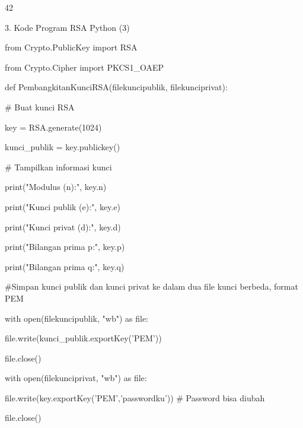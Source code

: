 \documentclass{article}
\begin{document}

42

3. Kode Program RSA Python (3)

from Crypto.PublicKey import RSA

from Crypto.Cipher import PKCS1\_OAEP

def PembangkitanKunciRSA(filekuncipublik, filekunciprivat):

    \# Buat kunci RSA

    key = RSA.generate(1024)

    kunci\_publik = key.publickey()


    \# Tampilkan informasi kunci

    print("Modulus (n):", key.n)

    print("Kunci publik (e):", key.e)

    print("Kunci privat (d):", key.d)

    print("Bilangan prima p:", key.p)

    print("Bilangan prima q:", key.q)

    \#Simpan kunci publik dan kunci privat ke dalam dua file kunci berbeda, format PEM

    with open(filekuncipublik, "wb") as file:

         file.write(kunci\_publik.exportKey('PEM'))

         file.close()

    with open(filekunciprivat, "wb") as file:

         file.write(key.exportKey('PEM','passwordku'))  \# Password bisa diubah

         file.close()
\end{document}
